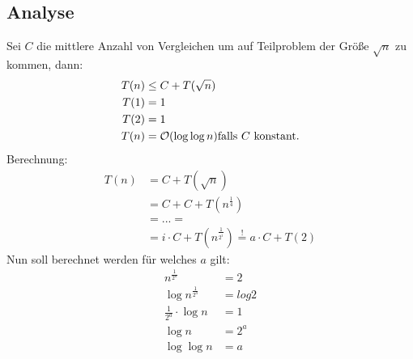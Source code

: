         \subsection{Analyse}
            Sei $C$ die mittlere Anzahl von Vergleichen um auf Teilproblem der Größe $\sqrt{n}$ zu kommen, dann: \\
            \begin{align*}
                T(n) &\leq C + T(\sqrt{n}) \\
                T(1) &= 1 \\
				T(2) &= 1 \\
                T(n) &= \mathcal{O}(\log \log n) \text{falls } C \text{ konstant.}
            \end{align*}
            Berechnung:
            \begin{align*}
                T(n) &= C + T(\sqrt{n})  \\
                &= C + C + T\left(n^{\frac{1}{4}}\right) \\
                &= ... = \\
                &= i \cdot C + T\left(n^{\frac{1}{2^i}}\right) \overset{!}{=} a \cdot C + T(2)
            \end{align*}
            Nun soll berechnet werden für welches $a$ gilt:
            \begin{align*}
                n^{\frac{1}{2^{a}}} &= 2 \\
                \log n^{\frac{1}{2^{a}}} &= log 2 \\
                \frac{1}{2^{a}}\cdot \log n &= 1 \\
                \log n &= 2^{a} \\
                \log{ \log n} &= a
            \end{align*}
        
